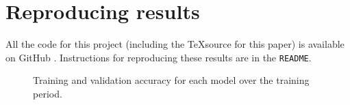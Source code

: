 \FloatBarrier

\appendix

\section{Reproducing results}

All the code for this project (including the \TeX source for this paper) is available on GitHub \cite{stat-comps-github}. Instructions for reproducing these results are in the \texttt{README}.

\begin{figure}
	\centering
	
	\caption{Training and validation accuracy for each model over the training period.}
	\label{fig:training-curves}
\end{figure}
